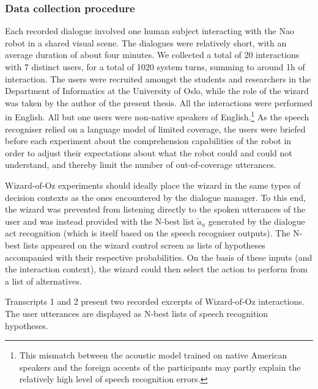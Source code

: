 \subsubsection*{Data collection procedure}

 Each recorded dialogue involved one human subject interacting with the Nao robot in a shared visual scene.  The dialogues were relatively short, with an average duration of about four minutes. We collected a total of 20 interactions with 7 distinct users, for a total of 1020 system turns, summing to around 1h of interaction.  The users were recruited amongst the students and researchers in the Department of Informatics at the University of Oslo, while the role of the wizard was taken by the author of the present thesis.  All the interactions were performed in English. All but one users were non-native speakers of English.\footnote{This mismatch between the acoustic model trained on native American speakers and the foreign accents of the participants may partly explain the relatively high level of speech recognition errors.}  As the speech recogniser relied on a language model of limited coverage, the users were briefed before each experiment about the comprehension capabilities of the robot in order to adjust their expectations about what the robot could and could not understand, and thereby limit the number of out-of-coverage utterances.

Wizard-of-Oz experiments should ideally place the wizard in the same types of decision contexts as the ones encountered by the dialogue manager. To this end, the wizard was prevented from listening directly to the spoken utterances of the user and was instead provided with the N-best list $\tilde{a}_u$ generated by the dialogue act recognition (which is itself based on the speech recogniser outputs).  The N-best lists appeared on the wizard control screen as lists of hypotheses accompanied with their respective probabilities. On the basis of these inputs (and the interaction context), the wizard could then select the action to perform from a list of alternatives.  

Transcripts 1 and 2 present two recorded excerpts of Wizard-of-Oz interactions.  The user utterances are displayed as N-best lists of speech recognition hypotheses. 

